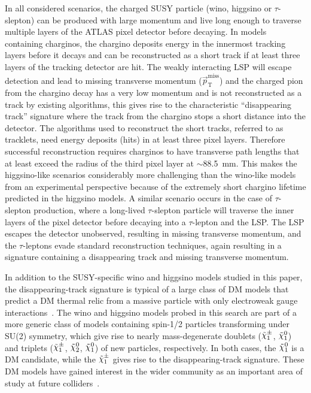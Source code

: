In all considered scenarios, the charged SUSY particle (wino, higgsino or $\tau$-slepton) can be produced with large momentum and live long enough to traverse multiple layers of the ATLAS pixel detector before decaying. In models containing charginos, the chargino deposits energy in the innermost tracking layers before it decays and can be reconstructed as a short track if at least three layers of the tracking detector are hit.
The weakly interacting LSP will escape detection and lead to missing transverse momentum ($\vec{p}_\text{T}^\text{miss}$) and the charged pion from the chargino decay has a very low momentum and is not reconstructed as a track by existing algorithms, this gives rise to the characteristic \enquote{disappearing track} signature where the track from the chargino stops a short distance into the detector. The algorithms used to reconstruct the short tracks, referred to as tracklets, need energy deposits (hits) in at least three pixel layers. Therefore successful reconstruction requires charginos to have transverse path lengths that at least exceed the radius of the third pixel layer at  $\sim$88.5~mm.
This makes the higgsino-like scenarios considerably more challenging than the wino-like models from an experimental perspective because of the extremely short chargino lifetime predicted in the higgsino models. A similar scenario occurs in the case of $\tau$-slepton production, where a long-lived $\tau$-slepton particle will traverse the inner layers of the pixel detector before decaying into a $\tau$-lepton and the LSP. The LSP escapes the detector unobserved, resulting in missing transverse momentum, and the $\tau$-leptons evade standard reconstruction techniques, again resulting in a signature containing a disappearing track and missing transverse momentum. 

In addition to the SUSY-specific wino and higgsino models studied in this paper, the disappearing-track signature is typical of a large class of DM models that predict a DM thermal relic from a massive particle with only electroweak gauge interactions~\cite{Cirelli:2005uq}. 
The wino and higgsino models probed in this search are part of a more generic class of models containing spin-1/2 particles transforming under SU(2) symmetry, which give rise to nearly mass-degenerate doublets ($\chinoonepm$, $\ninoone$) and triplets ($\chinoonepm$, $\ninotwo$, $\ninoone$) of new particles, respectively. In both cases, the $\ninoone$ is a DM candidate, while the $\chinoonepm$ gives rise to the disappearing-track signature. These DM models have gained interest in the wider community as an important area of study at future colliders~\cite{CidVidal:2018eel,Saito:2019rtg,Capdevilla:2021fmj,Capdevilla:2024bwt}.

